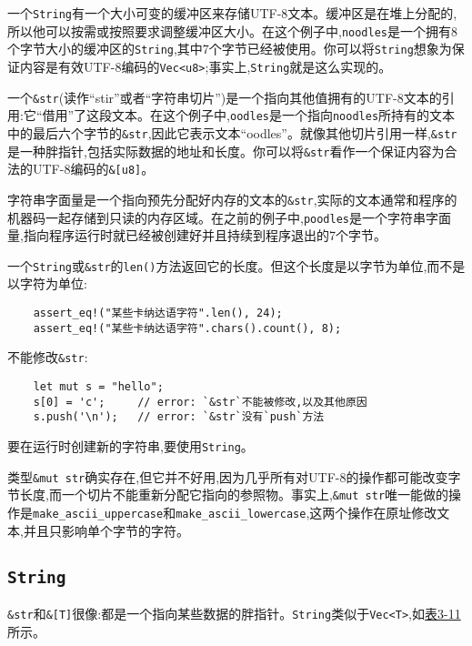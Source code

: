 一个\texttt{String}有一个大小可变的缓冲区来存储UTF-8文本。缓冲区是在堆上分配的,所以他可以按需或按照要求调整缓冲区大小。在这个例子中,\texttt{noodles}是一个拥有8个字节大小的缓冲区的\texttt{String},其中7个字节已经被使用。你可以将\texttt{String}想象为保证内容是有效UTF-8编码的\texttt{Vec<u8>};事实上,\texttt{String}就是这么实现的。

一个\texttt{\&str}(读作“stir”或者“字符串切片”)是一个指向其他值拥有的UTF-8文本的引用:它“借用”了这段文本。在这个例子中,\texttt{oodles}是一个指向\texttt{noodles}所持有的文本中的最后六个字节的\texttt{\&str},因此它表示文本“oodles”。就像其他切片引用一样,\texttt{\&str}是一种胖指针,包括实际数据的地址和长度。你可以将\texttt{\&str}看作一个保证内容为合法的UTF-8编码的\texttt{\&[u8]}。

字符串字面量是一个指向预先分配好内存的文本的\texttt{\&str},实际的文本通常和程序的机器码一起存储到只读的内存区域。在之前的例子中,\texttt{poodles}是一个字符串字面量,指向程序运行时就已经被创建好并且持续到程序退出的7个字节。

一个\texttt{String}或\texttt{\&str}的\texttt{len()}方法返回它的长度。但这个长度是以字节为单位,而不是以字符为单位:
\begin{verbatim}
    assert_eq!("某些卡纳达语字符".len(), 24);
    assert_eq!("某些卡纳达语字符".chars().count(), 8);
\end{verbatim}

不能修改\texttt{\&str}:
\begin{verbatim}
    let mut s = "hello";
    s[0] = 'c';     // error: `&str`不能被修改,以及其他原因
    s.push('\n');   // error: `&str`没有`push`方法
\end{verbatim}

要在运行时创建新的字符串,要使用\texttt{String}。

类型\texttt{\&mut str}确实存在,但它并不好用,因为几乎所有对UTF-8的操作都可能改变字节长度,而一个切片不能重新分配它指向的参照物。事实上,\texttt{\&mut str}唯一能做的操作是\texttt{make\_ascii\_uppercase}和\texttt{make\_ascii\_lowercase},这两个操作在原址修改文本,并且只影响单个字节的字符。

\subsection{\texttt{String}}
\texttt{\&str}和\texttt{\&[T]}很像:都是一个指向某些数据的胖指针。\texttt{String}类似于\texttt{Vec<T>},如\hyperref[t3-11]{表3-11}所示。

